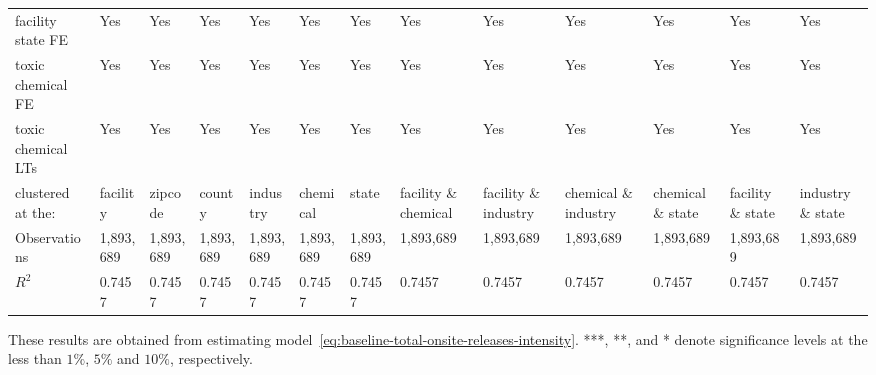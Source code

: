 \begin{table}[H]
{\begin{tabular}{@{}lllllllllllll@{}}
            facility state FE              & Yes       & Yes       & Yes       & Yes       & Yes       & Yes       & Yes                  & Yes                  & Yes                  & Yes               & Yes               & Yes               \\
            toxic chemical FE              & Yes       & Yes       & Yes       & Yes       & Yes       & Yes       & Yes                  & Yes                  & Yes                  & Yes               & Yes               & Yes               \\
            toxic chemical LTs             & Yes       & Yes       & Yes       & Yes       & Yes       & Yes       & Yes                  & Yes                  & Yes                  & Yes               & Yes               & Yes               \\ \midrule \midrule
            clustered at the:              & facility  & zipcode   & county    & industry  & chemical  & state     & facility \& chemical & facility \& industry & chemical \& industry & chemical \& state & facility \& state & industry \& state \\
            Observations                   & 1,893,689 & 1,893,689 & 1,893,689 & 1,893,689 & 1,893,689 & 1,893,689 & 1,893,689            & 1,893,689            & 1,893,689            & 1,893,689         & 1,893,689         & 1,893,689         \\
            $R^2$                          & 0.7457    & 0.7457    & 0.7457    & 0.7457    & 0.7457    & 0.7457    & 0.7457               & 0.7457               & 0.7457               & 0.7457            & 0.7457            & 0.7457            \\ \bottomrule \bottomrule
        \end{tabular}%
    }
    \begin{minipage}{18cm}
        \vspace{0.05in}
        These results are obtained from estimating model~\ref{eq:baseline-total-onsite-releases-intensity}. ***, **, and * denote significance levels at the less than $1\%$, $5\%$ and $10\%$, respectively.
    \end{minipage}
\end{table}